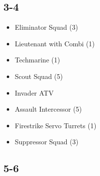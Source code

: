 \documentclass{HordeModeTarot}
\begin{document}
\begin{multicols}{2}

\subsection*{3-4}

\begin{itemize}[leftmargin=*]
\item[] Eliminator Squad (3)
\item[] Lieutenant with Combi (1)
\item[] Techmarine (1)
\item[] Scout Squad (5)
\item[] Invader ATV
\item[] Assault Intercessor (5)
\item[] Firestrike Servo Turrets (1)
\item[] Suppressor Squad (3)
\end{itemize}

\subsection*{5-6}


\end{multicols}
\end{document}
